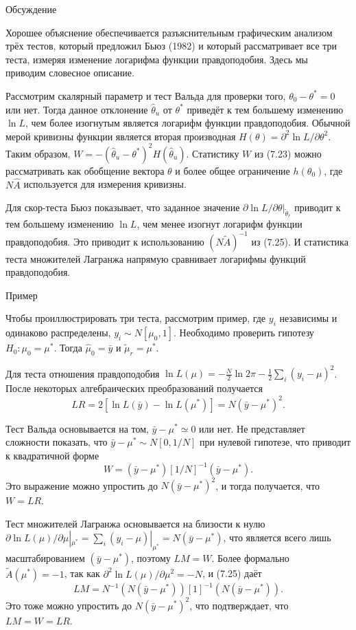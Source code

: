 \begin{center}
Обсуждение
\end{center}

Хорошее объяснение обеспечивается разъяснительным графическим анализом трёх тестов, который предложил Бьюз (1982) и который рассматривает все три теста, измеряя изменение логарифма функции правдоподобия. Здесь мы приводим словесное описание.

Рассмотрим скалярный параметр и тест Вальда для проверки того, $\theta_0 - \theta^* = 0$ или нет. Тогда данное отклонение $\hat{\theta}_u$ от $\theta^*$ приведёт к тем большему изменению $\ln L$, чем более изогнутым является  логарифм функции правдоподобия. Обычной мерой кривизны функции является вторая производная $H(\theta) = \partial^2{\ln L}/\partial{\theta}^2$. Таким образом, $W = -(\hat{\theta}_u - \theta^*)^2H(\hat{\theta}_u)$. Статистику $W$ из (7.23) можно рассматривать как обобщение вектора $\theta$ и более общее ограничение $h(\theta_0)$, где $N\hat{A}$ используется для измерения кривизны.

Для скор-теста Бьюз показывает, что заданное значение $\partial{\ln L}/\partial{\theta}|_{\tilde{\theta}_r}$ приводит к тем большему изменению $\ln L$, чем менее изогнут логарифм функции правдоподобия. Это приводит к использованию $(N\tilde{A})^{-1}$ из (7.25). И статистика теста множителей Лагранжа напрямую сравнивает логарифмы функций правдоподобия.

\begin{center}
Пример
\end{center}

Чтобы проиллюстрировать три теста, рассмотрим пример, где $y_i$ независимы и одинаково распределены, $y_i \sim N[\mu_0, 1]$. Необходимо проверить гипотезу $H_0: \mu_0 = \mu^*$. Тогда $\hat{\mu}_0 = \bar{y}$ и $\tilde{\mu}_r = \mu^*$.

Для теста отношения правдоподобия $\ln L(\mu) = -\frac{N}{2}\ln 2\pi - \frac{1}{2}\sum_i (y_i - \mu)^2$. После некоторых алгебраических преобразований получается
\[
LR = 2[\ln L(\bar{y}) - \ln L(\mu^*)] = N(\bar{y} - \mu^*)^2.
\]

Тест Вальда основывается на том, $\bar{y} - \mu^* \simeq 0$ или нет. Не представляет сложности показать, что $\bar{y} - \mu^* \sim N[0, 1/N]$ при нулевой гипотезе, что приводит к квадратичной форме
\[
W = (\bar{y} - \mu^*)[1/N]^{-1}(\bar{y} - \mu^*).
\]
Это выражение можно упростить до $N(\bar{y} - \mu^*)^2$, и тогда получается, что $W = LR$.

Тест множителей Лагранжа основывается на близости к нулю $\partial{\ln L(\mu)}/\partial{\mu}|_{\mu^*} = \sum_i (y_i - \mu)|_{\mu^*} = N(\bar{y} - \mu^*)$, что является всего лишь масштабированием $(\bar{y} - \mu^*)$, поэтому $LM = W$. Более формально $\tilde{A}(\mu^*) = -1$, так как $\partial^2{\ln L(\mu)}/\partial{\mu^2} = -N$, и (7.25) даёт
\[
LM = N^{-1}(N(\bar{y} - \mu^*))[1]^{-1}(N(\bar{y} - \mu^*)).
\]
Это тоже можно упростить до $N(\bar{y} - \mu^*)^2$, что подтверждает, что $LM = W = LR$.

